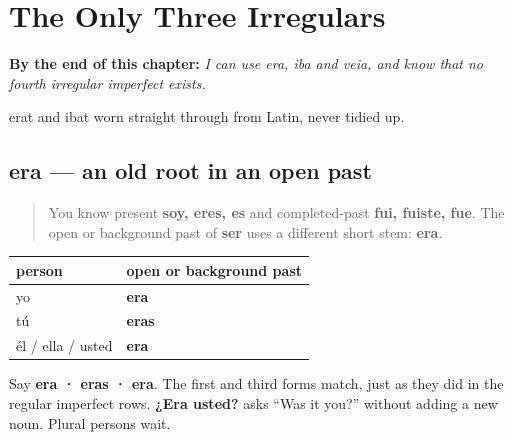
\chapter{The Only Three Irregulars}
\label{ch:spanish-imperfecto-irregulares}

\begin{chapteropening}
\textbf{By the end of this chapter:} \emph{I can use era, iba and veia, and know that no fourth irregular imperfect exists.}

erat and ibat worn straight through from Latin, never tidied up.
\end{chapteropening}

\section[era]{era — an old root in an open past}

\label{lesson:ES-C16-ser-imperfecto}



\begin{quote}
You know present \textbf{soy, eres, es} and completed-past \textbf{fui, fuiste, fue}. The open or background past of \textbf{ser} uses a different short stem: \textbf{era}.
\end{quote}

\begin{grammarlens}[title={Grammar Lens: the singular ser row}]
\noindent
\begin{tabularx}{\linewidth}{@{}>{\raggedright\arraybackslash}X>{\raggedright\arraybackslash}X@{}}
\toprule
\textbf{person} & \textbf{open or background past} \\
\midrule
yo & \textbf{era} \\
tú & \textbf{eras} \\
él / ella / usted & \textbf{era} \\
\bottomrule
\end{tabularx}

Say \textbf{era · eras · era}. The first and third forms match, just as they did in the regular imperfect rows. \textbf{¿Era usted?} asks “Was it you?” without adding a new noun. Plural persons wait.
\end{grammarlens}

